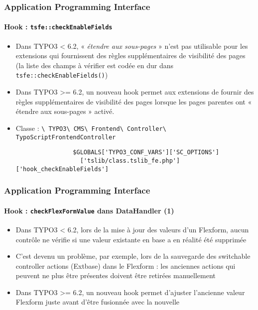 \begin{frame}[fragile]
	\frametitle{Application Programming Interface}
	\framesubtitle{Hook : \texttt{tsfe::checkEnableFields}}

	\begin{itemize}
		\item Dans TYPO3 < 6.2, « \emph{étendre aux sous-pages} » n'est pas utilisable pour les extensions qui fournissent des règles supplémentaires de visibilité des pages (la liste des champs à vérifier est codée en dur dans \texttt{tsfe::checkEnableFields()})

		\item Dans TYPO3 >= 6.2, un nouveau hook permet aux extensions de fournir des règles supplémentaires de visibilité des pages lorsque les pages parentes ont « étendre aux sous-pages » activé.
		\item Classe :\newline
			\smaller
				\texttt{\textbackslash
					TYPO3\textbackslash
					CMS\textbackslash
					Frontend\textbackslash
					Controller\textbackslash
					TypoScriptFrontendController}\normalsize

			\lstset{
				basicstyle=\smaller\ttfamily
			}

			\begin{lstlisting}
				$GLOBALS['TYPO3_CONF_VARS']['SC_OPTIONS']
				  ['tslib/class.tslib_fe.php']['hook_checkEnableFields']
			\end{lstlisting}

	\end{itemize}

\end{frame}


\begin{frame}[fragile]
	\frametitle{Application Programming Interface}
	\framesubtitle{Hook : \texttt{checkFlexFormValue} dans DataHandler (1)}

	\begin{itemize}
		\item Dans TYPO3 < 6.2, lors de la mise à jour des valeurs d'un Flexform, aucun contrôle ne vérifie si une valeur existante en base a en réalité été supprimée
		\item C'est devenu un problème, par exemple, lors de la sauvegarde des switchable controller actions (Extbase) dans le Flexform : les anciennes actions qui peuvent ne plus être présentes doivent être retirées manuellement

		\item Dans TYPO3 >= 6.2, un nouveau hook permet d'ajuster l'ancienne valeur Flexform juste avant d'être fusionnée avec la nouvelle

	\end{itemize}

\end{frame}


